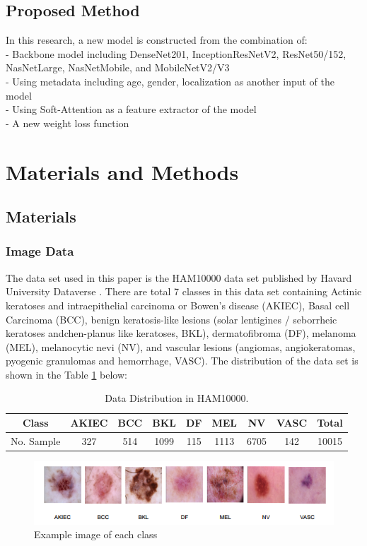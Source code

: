 \documentclass[sensors,article,submit,pdftex,moreauthors]{Definitions/mdpi}
\begin{document}
\subsection{Proposed Method}
In this research, a new model is constructed from the combination of:\\
- Backbone model including DenseNet201, InceptionResNetV2, ResNet50/152, NasNetLarge, NasNetMobile, and MobileNetV2/V3\\
- Using metadata including age, gender, localization as another input of the model\\
- Using Soft-Attention as a feature extractor of the model\\
- A new weight loss function
\section{Materials and Methods}
\subsection{Materials}
\subsubsection{Image Data}
The data set used in this paper is the HAM10000 data set published by Havard University Dataverse \cite{10417}. There are total 7 classes in this data set containing Actinic keratoses and intraepithelial carcinoma or Bowen's disease (AKIEC), Basal cell Carcinoma (BCC),  benign keratosis-like lesions (solar lentigines / seborrheic keratoses andchen-planus like keratoses, BKL), dermatofibroma (DF), melanoma (MEL), melanocytic nevi (NV), and vascular lesions (angiomas, angiokeratomas, pyogenic granulomas and hemorrhage, VASC). The distribution of the data set is shown in the Table \ref{table:data-distribution} below:

\begin{table}[H]
	\centering
	\begin{tabular}{|c c c c c c c c c|} 
		\hline
		Class & AKIEC & BCC & BKL & DF & MEL & NV & VASC & Total \\ 
		\hline
		No. Sample & 327 & 514 & 1099 & 115 & 1113 & 6705 & 142 & 10015 \\
		\hline
	\end{tabular}
	\caption{Data Distribution in HAM10000.}
	\label{table:data-distribution}
\end{table}

\begin{figure}[H]
	\centering
	\includegraphics[width=1\linewidth]{Definitions/DataDistribution}
	\caption{Example image of each class}
	\label{fig:data-sample}
\end{figure}
\end{document}
